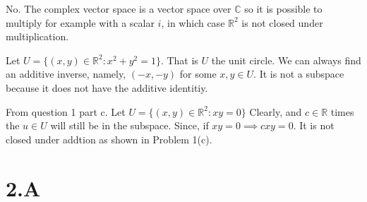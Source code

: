 \documentclass[10pt, twocolumn]{article}
\newcommand{\C}{\mathbb{C}}
\newcommand{\R}{\mathbb{R}}
\begin{document}
\begin{q}[Problem 5]
    No. The complex vector space is a vector space over $ \C $ so it is possible to multiply for example with a scalar $ i $, 
    in which case $ \R^2 $ is not closed under multiplication.
\end{q}
\begin{q}[Problem 7]
    Let $ U = \{(x, y) \in \R^2 : x^2 + y^2 = 1\} $. That is $ U $ the unit circle. 
    We can always find an additive inverse, namely, $(-x, -y)$ for some $ x, y \in U $. 
    It is not a subspace because it does not have the additive identitiy.
\end{q}
\begin{q}[Problem 8]
    From question 1 part c. 
    Let $U =\{(x, y) \in \R^2 : xy = 0\} $
    Clearly, and $ c \in \R $ times the $ u \in U $ will still be in the subspace. Since, if $ xy = 0 \implies cxy = 0 $. 
    It is not closed under addtion as shown in Problem 1(c).
\end{q}

\section{2.A}
\end{document}
